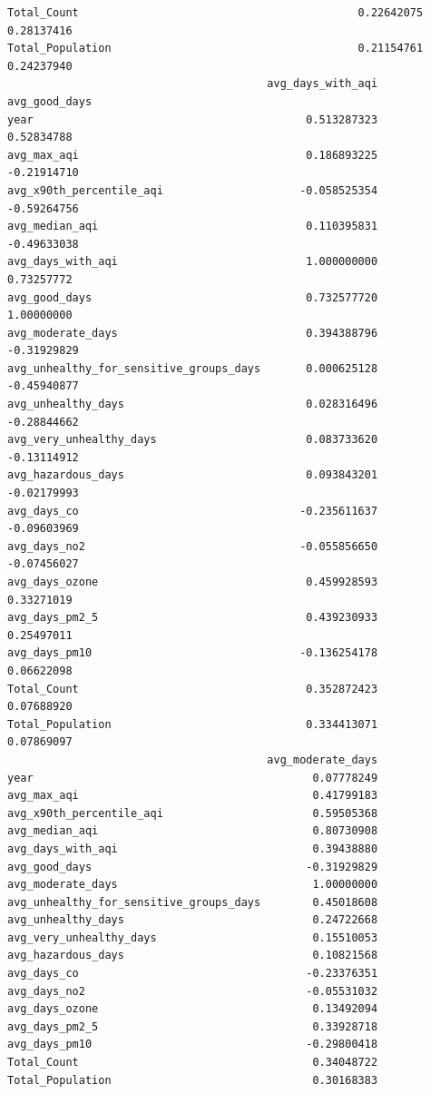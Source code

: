 \documentclass[
  12pt,
]{article}
\begin{document}
\begin{verbatim}
Total_Count                                           0.22642075     0.28137416
Total_Population                                      0.21154761     0.24237940
                                        avg_days_with_aqi avg_good_days
year                                          0.513287323    0.52834788
avg_max_aqi                                   0.186893225   -0.21914710
avg_x90th_percentile_aqi                     -0.058525354   -0.59264756
avg_median_aqi                                0.110395831   -0.49633038
avg_days_with_aqi                             1.000000000    0.73257772
avg_good_days                                 0.732577720    1.00000000
avg_moderate_days                             0.394388796   -0.31929829
avg_unhealthy_for_sensitive_groups_days       0.000625128   -0.45940877
avg_unhealthy_days                            0.028316496   -0.28844662
avg_very_unhealthy_days                       0.083733620   -0.13114912
avg_hazardous_days                            0.093843201   -0.02179993
avg_days_co                                  -0.235611637   -0.09603969
avg_days_no2                                 -0.055856650   -0.07456027
avg_days_ozone                                0.459928593    0.33271019
avg_days_pm2_5                                0.439230933    0.25497011
avg_days_pm10                                -0.136254178    0.06622098
Total_Count                                   0.352872423    0.07688920
Total_Population                              0.334413071    0.07869097
                                        avg_moderate_days
year                                           0.07778249
avg_max_aqi                                    0.41799183
avg_x90th_percentile_aqi                       0.59505368
avg_median_aqi                                 0.80730908
avg_days_with_aqi                              0.39438880
avg_good_days                                 -0.31929829
avg_moderate_days                              1.00000000
avg_unhealthy_for_sensitive_groups_days        0.45018608
avg_unhealthy_days                             0.24722668
avg_very_unhealthy_days                        0.15510053
avg_hazardous_days                             0.10821568
avg_days_co                                   -0.23376351
avg_days_no2                                  -0.05531032
avg_days_ozone                                 0.13492094
avg_days_pm2_5                                 0.33928718
avg_days_pm10                                 -0.29800418
Total_Count                                    0.34048722
Total_Population                               0.30168383

\end{verbatim}
\end{document}
